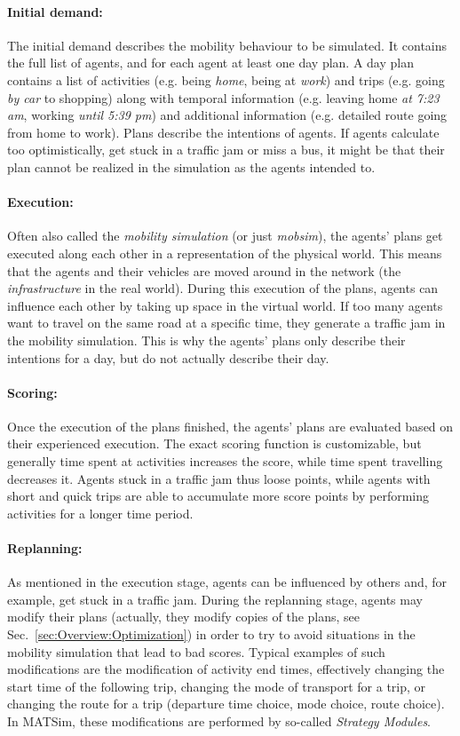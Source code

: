 \paragraph{Initial demand:}
The initial demand describes the mobility behaviour to be simulated. It contains
the full list of agents, and for each agent at least one day plan. A day plan
contains a list of activities (e.g. being \emph{home}, being at \emph{work}) and
trips (e.g. going \emph{by car} to shopping) along with temporal information
(e.g. leaving home \emph{at 7:23 am}, working \emph{until 5:39 pm}) and
additional information (e.g. detailed route going from home to work). Plans
describe the intentions of agents. If agents calculate too optimistically, get
stuck in a traffic jam or miss a bus, it might be that their plan cannot be
realized in the simulation as the agents intended to.

\paragraph{Execution:}
Often also called the \emph{mobility simulation} (or just \emph{mobsim}), the
agents' plans get executed along each other in a representation of the physical
world. This means that the agents and their vehicles are moved around in the
network (the \emph{infrastructure} in the real world). During this execution of
the plans, agents can influence each other by taking up space in the virtual
world. If too many agents want to travel on the same road at a specific time,
they generate a traffic jam in the mobility simulation. This is why the agents'
plans only describe their intentions for a day, but do not actually describe
their day.

\paragraph{Scoring:}
Once the execution of the plans finished, the agents' plans are evaluated based
on their experienced execution. The exact scoring function is customizable, but
generally time spent at activities increases the score, while time spent
travelling decreases it. Agents stuck in a traffic jam thus loose points, while
agents with short and quick trips are able to accumulate more score points by
performing activities for a longer time period.

\paragraph{Replanning:}
As mentioned in the execution stage, agents can be influenced by others and, for
example, get stuck in a traffic jam. During the replanning stage, agents may
modify their plans (actually, they modify copies of the plans, see
Sec.~\ref{sec:Overview:Optimization}) in order to try to avoid situations in the
mobility simulation that lead to bad scores. Typical examples of such
modifications are the modification of activity end times, effectively changing
the start time of the following trip, changing the mode of transport for a trip,
or changing the route for a trip (departure time choice, mode choice, route
choice). In MATSim, these modifications are performed by so-called
\emph{Strategy Modules}.

